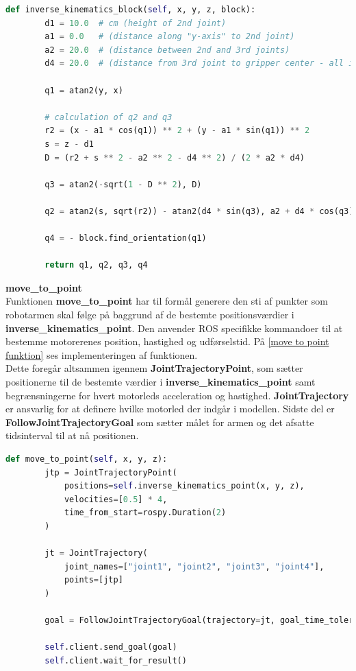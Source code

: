 \begin{lstlisting}[caption=inverse\_kinematics funktion, label=inverse kinematics funktion, language=Python]
    def inverse_kinematics_block(self, x, y, z, block):
        d1 = 10.0  # cm (height of 2nd joint)
        a1 = 0.0   # (distance along "y-axis" to 2nd joint)
        a2 = 20.0  # (distance between 2nd and 3rd joints)
        d4 = 20.0  # (distance from 3rd joint to gripper center - all inclusive, ie. also 4th joint)

        q1 = atan2(y, x)

        # calculation of q2 and q3
        r2 = (x - a1 * cos(q1)) ** 2 + (y - a1 * sin(q1)) ** 2
        s = z - d1
        D = (r2 + s ** 2 - a2 ** 2 - d4 ** 2) / (2 * a2 * d4)

        q3 = atan2(-sqrt(1 - D ** 2), D)

        q2 = atan2(s, sqrt(r2)) - atan2(d4 * sin(q3), a2 + d4 * cos(q3)) - pi / 2

        q4 = - block.find_orientation(q1)

        return q1, q2, q3, q4
\end{lstlisting}

\textbf{move\_to\_point}\\
Funktionen \textbf{move\_to\_point} har til formål generere den sti af punkter som robotarmen skal følge på baggrund af de bestemte positionsværdier i \textbf{inverse\_kinematics\_point}. Den anvender ROS specifikke kommandoer til at bestemme motorerenes position, hastighed og udførselstid. På \autoref{move to point funktion} ses implementeringen af funktionen.\\

Dette foregår altsammen igennem \textbf{JointTrajectoryPoint}, som sætter positionerne til de bestemte værdier i \textbf{inverse\_kinematics\_point} samt begrænsningerne for hvert motorleds acceleration og hastighed. \textbf{JointTrajectory} er ansvarlig for at definere hvilke motorled der indgår i modellen. Sidste del er \textbf{FollowJointTrajectoryGoal} som sætter målet for armen og det afsatte tidsinterval til at nå positionen.\\

\begin{lstlisting}[caption=move\_to\_point funktion, label=move to point funktion, language=Python]
    def move_to_point(self, x, y, z):
        jtp = JointTrajectoryPoint(
            positions=self.inverse_kinematics_point(x, y, z),
            velocities=[0.5] * 4,
            time_from_start=rospy.Duration(2)
        )

        jt = JointTrajectory(
            joint_names=["joint1", "joint2", "joint3", "joint4"],
            points=[jtp]
        )

        goal = FollowJointTrajectoryGoal(trajectory=jt, goal_time_tolerance=rospy.Duration(4))

        self.client.send_goal(goal)
        self.client.wait_for_result()
\end{lstlisting}

